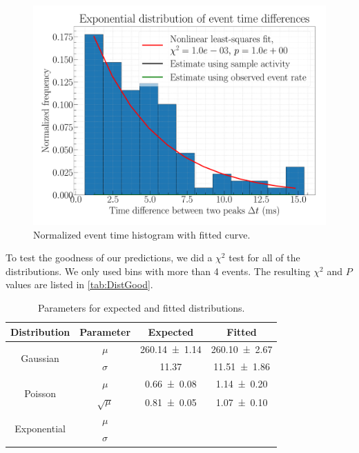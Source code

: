 \begin{figure}[H]
\centering
\includegraphics[width=\textwidth]{../Figures/Geiger_eventtime_histogram_fit.pdf}
\caption{Normalized event time histogram with fitted curve.}
\label{fig:ExpFit}
\end{figure}

To test the goodness of our predictions, we did a $\chi^2$ test for all of the distributions. We only used bins with more than 4 events. The resulting $\chi^2$ and $P$ values are listed in \cref{tab:DistGood}.

\begin{table}[H]
	\renewcommand{\arraystretch}{1.5}
	\centering
	\begin{tabular}{|c|c|c|c|}
		\hline
		Distribution & Parameter & Expected & Fitted \\
		\hline
		\multirow{2}{*}{Gaussian} & $\mu$ & \SI{260.14 \pm 1.14}{} & \SI{260.10 \pm 2.67}{} \\
		 & $\sigma$ & \SI{11.37}{} & \SI{11.51 \pm 1.86}{} \\
		\hline
		\multirow{2}{*}{Poisson} & $\mu$ & \SI{0.66 \pm 0.08}{} & \SI{1.14 \pm 0.20}{} \\
		 & $\sqrt{\mu}$ & \SI{0.81 \pm 0,05}{} & \SI{1,07 \pm 0,10}{} \\
		\hline
		\multirow{2}{*}{Exponential} & $\mu$ & \SI{}{} & \SI{}{} \\
		 & $\sigma$ & \SI{}{} & \SI{}{} \\
		\hline
	\end{tabular}
	\caption{Parameters for expected and fitted distributions.}
	\label{tab:DistPara}
\end{table}


